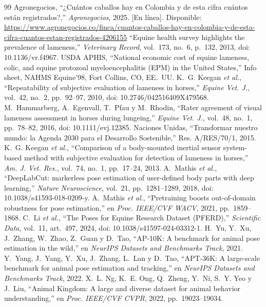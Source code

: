 \documentclass[conference,a4paper]{IEEEtran}
\begin{document}
\begin{thebibliography}{99}
 Agronegocios, ``¿Cuántos caballos hay en Colombia y de esta cifra cuántos están registrados?,'' \emph{Agronegocios}, 2025. [En línea]. Disponible: \url{https://www.agronegocios.co/finca/cuantos-caballos-hay-en-colombia-y-de-esta-cifra-cuantos-estan-registrados-4206155}
 ``Equine health survey highlights the prevalence of lameness,'' \emph{Veterinary Record}, vol.~173, no.~6, p.~132, 2013, doi: 10.1136/vr.f4967.
 USDA APHIS, ``National economic cost of equine lameness, colic, and equine protozoal myeloencephalitis (EPM) in the United States,'' Info sheet, NAHMS Equine'98, Fort Collins, CO, EE.~UU.
 K.~G. Keegan \emph{et al.}, ``Repeatability of subjective evaluation of lameness in horses,'' \emph{Equine Vet. J.}, vol.~42, no.~2, pp.~92--97, 2010, doi: 10.2746/042516409X479568.
 M.~Hammarberg, A.~Egenvall, T.~Pfau y M.~Rhodin, ``Rater agreement of visual lameness assessment in horses during lungeing,'' \emph{Equine Vet. J.}, vol.~48, no.~1, pp.~78--82, 2016, doi: 10.1111/evj.12385.
 Naciones Unidas, ``Transformar nuestro mundo: la Agenda 2030 para el Desarrollo Sostenible,'' Res. A/RES/70/1, 2015.
 K.~G. Keegan \emph{et al.}, ``Comparison of a body-mounted inertial sensor system-based method with subjective evaluation for detection of lameness in horses,'' \emph{Am. J. Vet. Res.}, vol.~74, no.~1, pp.~17--24, 2013.
 A.~Mathis \emph{et al.}, ``DeepLabCut: markerless pose estimation of user-defined body parts with deep learning,'' \emph{Nature Neuroscience}, vol.~21, pp.~1281--1289, 2018, doi: 10.1038/s41593-018-0209-y.
 A.~Mathis \emph{et al.}, ``Pretraining boosts out-of-domain robustness for pose estimation,'' en \emph{Proc. IEEE/CVF WACV}, 2021, pp.~1859--1868.
 C.~Li \emph{et al.}, ``The Poses for Equine Research Dataset (PFERD),'' \emph{Scientific Data}, vol.~11, art.~497, 2024, doi: 10.1038/s41597-024-03312-1.
 H.~Yu, Y.~Xu, J.~Zhang, W.~Zhao, Z.~Guan y D.~Tao, ``AP-10K: A benchmark for animal pose estimation in the wild,'' en \emph{NeurIPS Datasets and Benchmarks Track}, 2021.
 Y.~Yang, J.~Yang, Y.~Xu, J.~Zhang, L.~Lan y D.~Tao, ``APT-36K: A large-scale benchmark for animal pose estimation and tracking,'' en \emph{NeurIPS Datasets and Benchmarks Track}, 2022.
 X.~L. Ng, K.~E. Ong, Q.~Zheng, Y.~Ni, S.~Y. Yeo y J.~Liu, ``Animal Kingdom: A large and diverse dataset for animal behavior understanding,'' en \emph{Proc. IEEE/CVF CVPR}, 2022, pp.~19023--19034.

\end{thebibliography}
\end{document}
